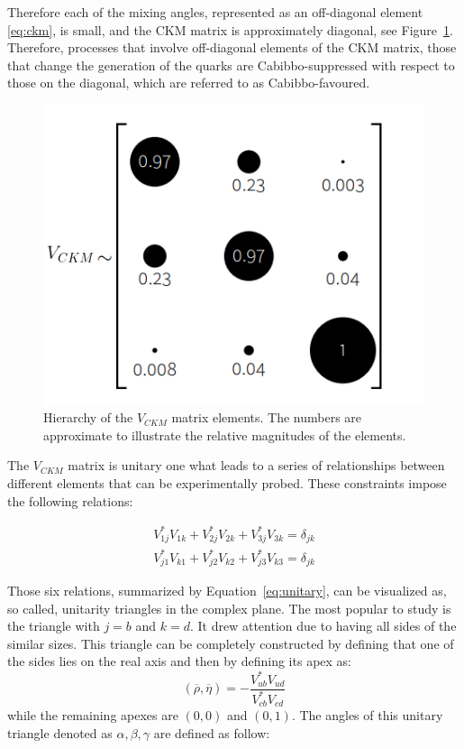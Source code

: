  Therefore each of the mixing angles, represented as an off-diagonal element \ref{eq:ckm}, is small, and the CKM matrix is approximately diagonal, see Figure~\ref{fig:ckm_magnitudes}. Therefore, processes that involve off-diagonal elements of the CKM matrix, those that change the generation of the quarks are Cabibbo-suppressed with respect to those on the diagonal, which are referred to as Cabibbo-favoured.

\begin{figure}[h]
\centering
\includegraphics[scale=0.5]{figures/ckm_structure.PNG}
\caption{Hierarchy of the $V_{CKM}$ matrix elements. The numbers are approximate to illustrate the relative magnitudes of the elements.  
\label{fig:ckm_magnitudes}}
\end{figure}

 The $V_{CKM}$ matrix is unitary one what leads to a series of relationships between different elements that can be experimentally probed. These constraints impose the following relations:

\begin{equation}
\label{eq:unitary}
\begin{split}
        V_{1j}^{*}V_{1k} +  V_{2j}^{*}V_{2k} +  V_{3j}^{*}V_{3k} = \delta_{jk} \\
        V_{j1}^{*}V_{k1} +  V_{j2}^{*}V_{k2} +  V_{j3}^{*}V_{k3} = \delta_{jk} 
\end{split}
\end{equation}

Those six relations, summarized by Equation~\ref{eq:unitary}, can be visualized as, so called, unitarity triangles in the complex plane. The most popular to study is the triangle with  $j=b$ and $k=d$. It drew attention due to having all sides of the similar sizes. This triangle can be completely constructed by defining that one of the sides lies on the real axis and then by defining its apex as:
\begin{equation}
   (\overline{\rho}, \overline{\eta}) =- \frac{V_{ub}^{*}V_{ud}}{V_{cb}^{*}V_{cd}}
\end{equation}
while the remaining apexes are $(0,0)$ and $(0,1)$.  
The angles of this unitary triangle denoted as $\alpha, \beta, \gamma$ are defined as follow: 

